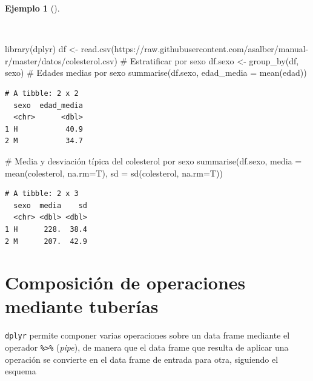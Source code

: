 \documentclass[
  a4paper,
]{scrreport}
\newenvironment{Shaded}{\begin{snugshade}}{\end{snugshade}}
\newcommand{\AttributeTok}[1]{\textcolor[rgb]{0.40,0.45,0.13}{#1}}
\newcommand{\CommentTok}[1]{\textcolor[rgb]{0.37,0.37,0.37}{#1}}
\newcommand{\FunctionTok}[1]{\textcolor[rgb]{0.28,0.35,0.67}{#1}}
\newcommand{\NormalTok}[1]{\textcolor[rgb]{0.00,0.23,0.31}{#1}}
\newcommand{\OtherTok}[1]{\textcolor[rgb]{0.00,0.23,0.31}{#1}}
\newcommand{\StringTok}[1]{\textcolor[rgb]{0.13,0.47,0.30}{#1}}
\theoremstyle{definition}
\theoremstyle{definition}
\newtheorem{example}{Ejemplo}[chapter]
\theoremstyle{remark}
\begin{document}
\begin{example}[]\protect\hypertarget{exm-group_by}{}\label{exm-group_by}

~

\begin{Shaded}
\begin{Highlighting}[]
\FunctionTok{library}\NormalTok{(dplyr)}
\NormalTok{df }\OtherTok{\textless{}{-}} \FunctionTok{read.csv}\NormalTok{(}\StringTok{\textquotesingle{}https://raw.githubusercontent.com/asalber/manual{-}r/master/datos/colesterol.csv\textquotesingle{}}\NormalTok{)}
\CommentTok{\# Estratificar por sexo }
\NormalTok{df.sexo }\OtherTok{\textless{}{-}} \FunctionTok{group\_by}\NormalTok{(df, sexo)}
\CommentTok{\# Edades medias por sexo}
\FunctionTok{summarise}\NormalTok{(df.sexo, }\AttributeTok{edad\_media =} \FunctionTok{mean}\NormalTok{(edad))}
\end{Highlighting}
\end{Shaded}

\begin{verbatim}
# A tibble: 2 x 2
  sexo  edad_media
  <chr>      <dbl>
1 H           40.9
2 M           34.7
\end{verbatim}

\begin{Shaded}
\begin{Highlighting}[]
\CommentTok{\# Media y desviación típica del colesterol por sexo}
\FunctionTok{summarise}\NormalTok{(df.sexo, }\AttributeTok{media =} \FunctionTok{mean}\NormalTok{(colesterol, }\AttributeTok{na.rm=}\NormalTok{T), }\AttributeTok{sd =} \FunctionTok{sd}\NormalTok{(colesterol, }\AttributeTok{na.rm=}\NormalTok{T))}
\end{Highlighting}
\end{Shaded}

\begin{verbatim}
# A tibble: 2 x 3
  sexo  media    sd
  <chr> <dbl> <dbl>
1 H      228.  38.4
2 M      207.  42.9
\end{verbatim}

\end{example}

\section{Composición de operaciones mediante
tuberías}\label{composiciuxf3n-de-operaciones-mediante-tuberuxedas}

\texttt{dplyr} permite componer varias operaciones sobre un data frame
mediante el operador \texttt{\%\textgreater{}\%} (\emph{pipe}), de
manera que el data frame que resulta de aplicar una operación se
convierte en el data frame de entrada para otra, siguiendo el esquema
\end{document}
